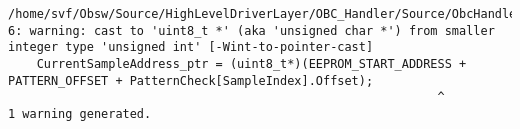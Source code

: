 
\noindent\begin{minipage}{\textwidth}
\begin{lstlisting}[language={}, caption=6th warning example., label=srciror_6]
/home/svf/Obsw/Source/HighLevelDriverLayer/OBC_Handler/Source/ObcHandler_ProcessingTask.c:130:3 6: warning: cast to 'uint8_t *' (aka 'unsigned char *') from smaller integer type 'unsigned int' [-Wint-to-pointer-cast]
	CurrentSampleAddress_ptr = (uint8_t*)(EEPROM_START_ADDRESS + PATTERN_OFFSET + PatternCheck[SampleIndex].Offset);
															^
1 warning generated.
\end{lstlisting}
\end{minipage}